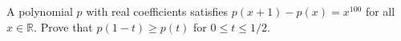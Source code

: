 A polynomial $p$ with real coefficients satisfies $p(x+1)-p(x)=x^{100}$ for all $x \in \mathbb{R}.$ Prove that $p(1-t) \ge p(t)$ for $0 \le t \le 1/2.$